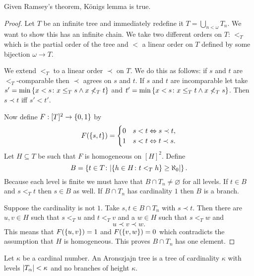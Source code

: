\begin{proposition}
    Given Ramsey's theorem, Königs lemma is true.

    \begin{proof}
        Let \(T\) be an infinite tree and immediately redefine it
        \(T=\bigcup_{n<\omega}T_{n}\). We want to show this has an infinite
        chain. We take two different orders on \(T\): \(<_{T}\) which is the
        partial order of the tree and \(<\) a linear order on \(T\) defined by
        some bijection \(\omega\to T\).

        We extend \(<_{T}\) to a linear order \(\prec\) on \(T\). We do this as
        follows: if \(s\) and \(t\) are \(<_{T}\)-comparable then \(\prec\)
        agrees on \(s\) and \(t\). If \(s\) and \(t\) are incomparable let take
        \(s'=\min\left\{x<s\colon x\leq_{T}s\wedge x\not<_{T}t\right\}\) and
        \(t'=\min\left\{x<s\colon x\leq_{T}t\wedge x\not<_{T}s\right\}\). Then \(s\prec
        t\) iff \(s'<t'\).

        Now define \(F:[T]^{2}\to\left\{0,1\right\}\) by
        \[
            F(\left\{s,t\right\})=\begin{cases}
                0 & s<t\Leftrightarrow s\prec t, \\
                1 & s<t\Leftrightarrow t\prec s.
            \end{cases}
        \]
        Let \(H\subseteq T\) be such that \(F\) is homogeneous on \([H]^{2}\).
        Define
        \[
            B=\setwith{t\in T}{\abs*{\setwith{h\in H}{t<_{T}h}\geq\aleph_{0}}}.
        \]
        Because each level is finite we must have that \(B\cap
        T_{n}\neq\varnothing\) for all levels. If \(t\in B\) and \(s<_{T}t\)
        then \(s\in B\) as well. If \(B\cap T_{n}\) has cardinality \(1\) then
        \(B\) is a branch.

        Suppose the cardinality is not \(1\). Take \(s,t\in B\cap T_{n}\) with
        \(s\prec t\). Then there are \(u,v\in H\) such that \(s<_{T}u\) and
        \(t<_{T}v\) and a \(w\in H\) such that \(s<_{T}w\) and
        \[
            u\prec v\prec w.
        \]
        This means that \(F(\left\{u,v\right\})=1\) and \(F(\left\{v,w\right\})=0\) which
        contradicts the assumption that \(H\) is homogeneous. This proves
        \(B\cap T_{n}\) has one element.
    \end{proof}
\end{proposition}

\begin{definition}
    Let \(\kappa\) be a cardinal number. An Aronszjajn tree is a tree of
    cardinality \(\kappa\) with levels \(\lvert T_{\alpha}\rvert<\kappa\) and
    no branches of height \(\kappa\).
\end{definition}

